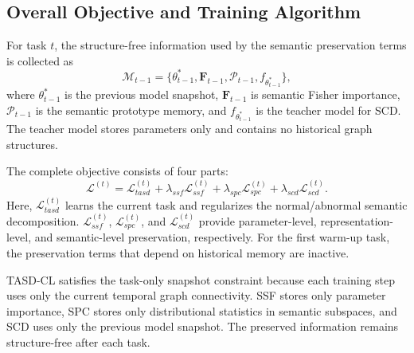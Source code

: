 \subsection{Overall Objective and Training Algorithm}
\label{subsec:overall-objective}

For task $t$, the structure-free information used by the semantic preservation terms is collected as
\begin{equation}
    \mathcal{M}_{t-1}
    =
    \{\theta^*_{t-1}, \mathbf{F}_{t-1}, \mathcal{P}_{t-1}, f_{\theta^*_{t-1}}\},
\end{equation}
where $\theta^*_{t-1}$ is the previous model snapshot, $\mathbf{F}_{t-1}$ is semantic Fisher importance, $\mathcal{P}_{t-1}$ is the semantic prototype memory, and $f_{\theta^*_{t-1}}$ is the teacher model for SCD. The teacher model stores parameters only and contains no historical graph structures.

The complete objective consists of four parts:
\begin{equation}
\label{eq:overall}
    \mathcal{L}^{(t)}
    =
    \mathcal{L}_{tasd}^{(t)}
    +
    \lambda_{ssf}\mathcal{L}_{ssf}^{(t)}
    +
    \lambda_{spc}\mathcal{L}_{spc}^{(t)}
    +
    \lambda_{scd}\mathcal{L}_{scd}^{(t)} .
\end{equation}
Here, $\mathcal{L}_{tasd}^{(t)}$ learns the current task and regularizes the normal/abnormal semantic decomposition. $\mathcal{L}_{ssf}^{(t)}$, $\mathcal{L}_{spc}^{(t)}$, and $\mathcal{L}_{scd}^{(t)}$ provide parameter-level, representation-level, and semantic-level preservation, respectively. For the first warm-up task, the preservation terms that depend on historical memory are inactive.

TASD-CL satisfies the task-only snapshot constraint because each training step uses only the current temporal graph connectivity. SSF stores only parameter importance, SPC stores only distributional statistics in semantic subspaces, and SCD uses only the previous model snapshot. The preserved information remains structure-free after each task.

